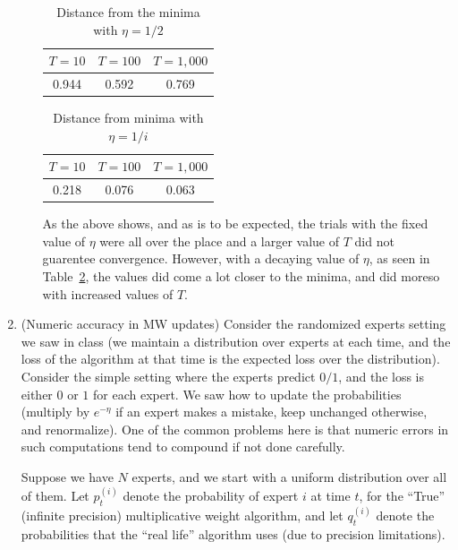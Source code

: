 \documentclass[12pt]{article}
\begin{document}
\begin{enumerate}
\begin{enumerate}
\begin{table}[H]
\centering
\caption{Distance from the minima with $\eta = 1/2$}
\begin{tabular}{c c c}
\hline\hline
$T = 10$ & $T = 100$ & $T = 1,000$\\
\hline
0.944 & 0.592 & 0.769\\
\hline
\end{tabular}
\label{table:fix}
\end{table}

\begin{table}[H]
\centering
\caption{Distance from minima with $\eta = 1/i$}
\begin{tabular}{c c c}
\hline\hline
$T = 10$ & $T = 100$ & $T = 1,000$\\
\hline
0.218 & 0.076 & 0.063\\
\hline
\end{tabular}
\label{table:decay}
\end{table}


As the above shows, and as is to be expected, the trials with the fixed value of $\eta$ were all over the place and a larger value of $T$ did not guarentee convergence. However, with a decaying value of $\eta$, as seen in Table~\ref{table:decay}, the values did come a lot closer to the minima, and did moreso with increased values of $T$.





\end{enumerate}

\item (Numeric accuracy in MW updates) Consider the randomized experts setting we saw in class (we maintain a distribution over experts at each time, and the loss of the algorithm at that time is the expected loss over the distribution). Consider the simple setting where the experts predict $0/1$, and the loss is either $0$ or $1$ for each expert. We saw how to update the probabilities (multiply by $e^{-\eta}$ if an expert makes a mistake, keep unchanged otherwise, and renormalize). One of the common problems here is that numeric errors in such computations tend to compound if not done carefully.

Suppose we have $N$ experts, and we start with a uniform distribution over all of them. Let $p_{t}^{(i)}$ denote the probability of expert $i$ at time $t$, for the ``True'' (infinite precision) multiplicative weight algorithm, and let $q_{t}^{(i)}$ denote the probabilities that the ``real life'' algorithm uses (due to precision limitations).


\end{enumerate}
\end{document}
